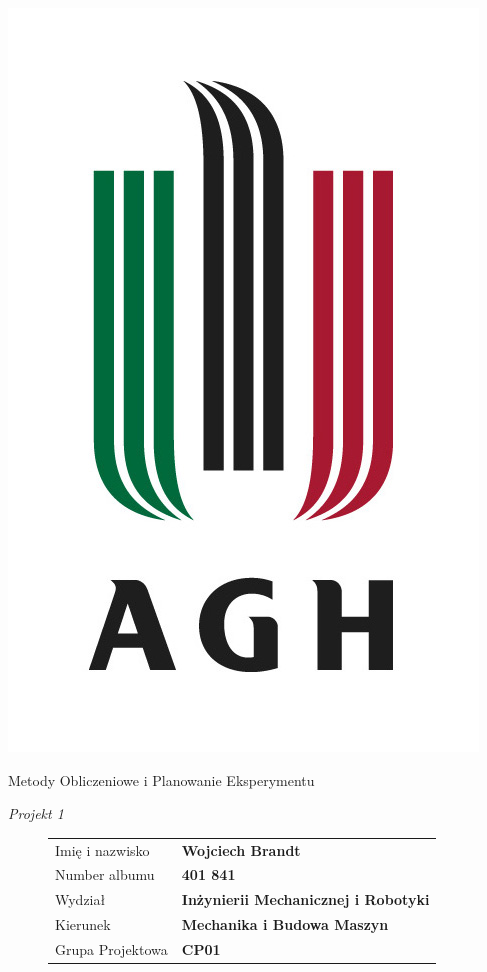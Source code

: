 \documentclass[a4paper, 12pt]{mwart}
\begin{document}
	\begin{titlepage}
		\begin{center}
			\includegraphics[height = 0.6\textheight]{pictures/agh_znk_wbr_rgb_150ppi.jpg}

			\begin{HUGE}
				Metody Obliczeniowe
				i Planowanie Eksperymentu
				\vspace{0.8cm}

				\emph{Projekt 1}
			\end{HUGE}

		\end{center}
		\begin{figure}[b]
			\begin{tabular}{m{4cm}l}
				Imię i nazwisko  & \textbf{Wojciech Brandt}\\
				Number albumu    & \textbf{401 841}\\
				Wydział          & \textbf{Inżynierii Mechanicznej i Robotyki}\\
				Kierunek         & \textbf{Mechanika i Budowa Maszyn}\\
				Grupa Projektowa & \textbf{CP01}
			\end{tabular}
		\end{figure}
	\end{titlepage}
\end{document}
